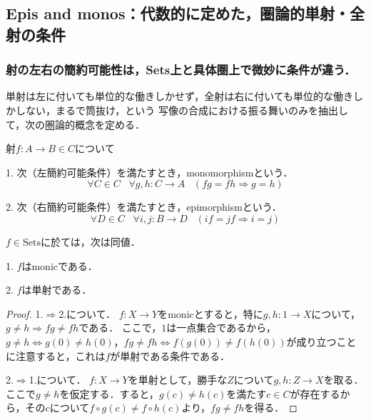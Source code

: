\documentclass[uplatex, dvipdfmx]{jsarticle}
\begin{document}
\subsection{Epis and monos：代数的に定めた，圏論的単射・全射の条件}\label{subsection-monoepi}

\subsubsection{射の左右の簡約可能性は，Sets上と具体圏上で微妙に条件が違う．}

単射は左に付いても単位的な働きしかせず，全射は右に付いても単位的な働きしかしない，まるで筒抜け，という
写像の合成における振る舞いのみを抽出して，次の圏論的概念を定める．
\begin{definition}[圏論的単射・全射]射$f:A\to B\in C$について

    1. 次（左簡約可能条件）を満たすとき，monomorphismという．
    \[ \forall C\in C\;\;\; \forall g,h:C\to A\;\;\; (fg=fh\Rightarrow g=h) \]
    \begin{center}
    \end{center}

    2. 次（右簡約可能条件）を満たすとき，epimorphismという．
    \[ \forall D\in C\;\;\; \forall i,j:B\to D\;\;\; (if=jf\Rightarrow i=j) \]
    \begin{center}
    \end{center}
\end{definition}

\begin{proposition}[Setsでは全射も全写も同値である]
    $f\in \mathrm{Sets}$に於ては，次は同値．

    1. $f$はmonicである．

    2. $f$は単射である．
\end{proposition}
\begin{proof}
    1.$\Rightarrow$2.について．
    $f:X\to Y$をmonicとすると，特に$g,h:1\to X$について，$g\ne h\Rightarrow fg\ne fh$である．
    ここで，$1$は一点集合であるから，$g\ne h\Leftrightarrow g(0)\ne h(0)$，$fg\ne fh\Leftrightarrow f(g(0))\ne f(h(0))$が成り立つことに注意すると，これは$f$が単射である条件である．

    2.$\Rightarrow$1.について．
    $f:X\to Y$を単射として，勝手な$Z$について$g,h:Z\to X$を取る．ここで$g\ne h$を仮定する．すると，$g(c)\ne h(c)$を満たす$c\in C$が存在するから，その$c$について$f\circ g(c)\ne f\circ h(c)$より，$fg\ne fh$を得る．
\end{proof}
\end{document}
